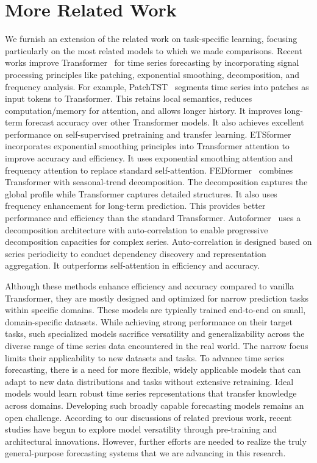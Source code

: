 \section{More Related Work}\label{appx:related_work} 
\noindent{} We furnish an extension of the related work on task-specific learning, focusing particularly on the most related models to which we made comparisons. Recent works improve Transformer~\citep{vaswani2017attention} for time series forecasting by incorporating signal processing principles like patching, exponential smoothing, decomposition, and frequency analysis. For example, PatchTST~\citep{nie2022time} segments time series into patches as input tokens to Transformer. This retains local semantics, reduces computation/memory for attention, and allows longer history. It improves long-term forecast accuracy over other Transformer models. It also achieves excellent performance on self-supervised pretraining and transfer learning. ETSformer~\citep{woo2022etsformer} incorporates exponential smoothing principles into Transformer attention to improve accuracy and efficiency. It uses exponential smoothing attention and frequency attention to replace standard self-attention. FEDformer~\citep{zhou2022fedformer} combines Transformer with seasonal-trend decomposition. The decomposition captures the global profile while Transformer captures detailed structures. It also uses frequency enhancement for long-term prediction. This provides better performance and efficiency than the standard Transformer. Autoformer~\citep{wu2021autoformer} uses a decomposition architecture with auto-correlation to enable progressive decomposition capacities for complex series. Auto-correlation is designed based on series periodicity to conduct dependency discovery and representation aggregation. It outperforms self-attention in efficiency and accuracy. 

Although these methods enhance efficiency and accuracy compared to vanilla Transformer, they are mostly designed and optimized for narrow prediction tasks within specific domains. These models are typically trained end-to-end on small, domain-specific datasets. While achieving strong performance on their target tasks, such specialized models sacrifice versatility and generalizability across the diverse range of time series data encountered in the real world. The narrow focus limits their applicability to new datasets and tasks. To advance time series forecasting, there is a need for more flexible, widely applicable models that can adapt to new data distributions and tasks without extensive retraining. Ideal models would learn robust time series representations that transfer knowledge across domains. Developing such broadly capable forecasting models remains an open challenge. According to our discussions of related previous work, recent studies have begun to explore model versatility through pre-training and architectural innovations. However, further efforts are needed to realize the truly general-purpose forecasting systems that we are advancing in this research.

